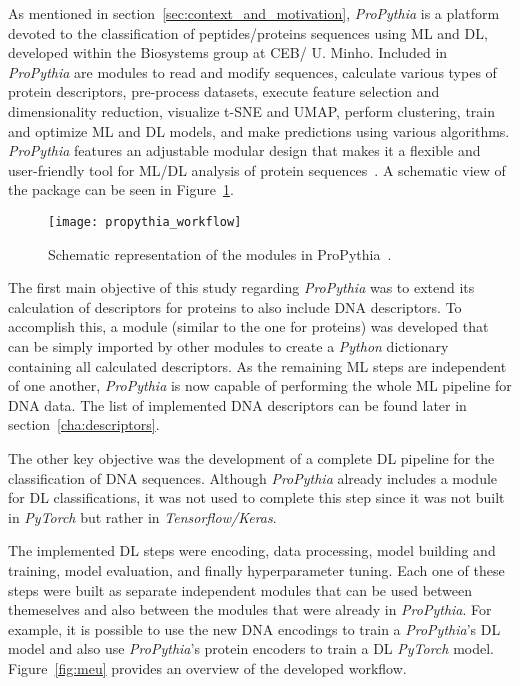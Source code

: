 As mentioned in section~\ref{sec:context_and_motivation}, \textit{ProPythia} is a platform devoted to the classification of peptides/proteins sequences using \gls{ML} and \gls{DL}, developed within the Biosystems group at CEB/ U. Minho. Included in \textit{ProPythia} are modules to read and modify sequences, calculate various types of protein descriptors, pre-process datasets, execute feature selection and dimensionality reduction, visualize t-SNE and UMAP, perform clustering, train and optimize \gls{ML} and \gls{DL} models, and make predictions using various algorithms. \textit{ProPythia} features an adjustable modular design that makes it a flexible and user-friendly tool for \gls{ML}/\gls{DL} analysis of protein sequences~\cite{Sequeira2020ProPythia:Learning}. A schematic view
of the package can be seen in Figure~\ref{fig:propythia_workflow}.

\begin{figure}[htbp]
    \centering
    \texttt{[image: propythia\_workflow]}
    \caption{Schematic representation of the modules in ProPythia~\cite{Sequeira2020ProPythia:Learning}.}
    \label{fig:propythia_workflow}
\end{figure}

The first main objective of this study regarding \textit{ProPythia} was to extend its calculation of descriptors for proteins to also include \gls{DNA} descriptors. To accomplish this, a module (similar to the one for proteins) was developed that can be simply imported by other modules to create a \textit{Python} dictionary containing all calculated descriptors. As the remaining \gls{ML} steps are independent of one another, \textit{ProPythia} is now capable of performing the whole \gls{ML} pipeline for \gls{DNA} data. The list of implemented \gls{DNA} descriptors can be found later in section~\ref{cha:descriptors}.

The other key objective was the development of a complete \gls{DL} pipeline for the classification of \gls{DNA} sequences. Although \textit{ProPythia} already includes a module for \gls{DL} classifications, it was not used to complete this step since it was not built in \textit{PyTorch} but rather in \textit{Tensorflow/Keras}.

The implemented \gls{DL} steps were encoding, data processing, model building and training, model evaluation, and finally hyperparameter tuning. Each one of these steps were built as separate independent modules that can be used between themeselves and also between the modules that were already in \textit{ProPythia}. For example, it is possible to use the new \gls{DNA} encodings to train a \textit{ProPythia}'s \gls{DL} model and also use \textit{ProPythia}'s protein encoders to train a \gls{DL} \textit{PyTorch} model. Figure~\ref{fig:meu} provides an overview of the developed workflow.

